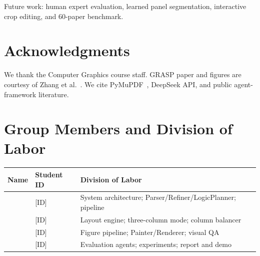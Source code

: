 \documentclass{article}
\begin{document}
Future work: human expert evaluation, learned panel segmentation, interactive crop editing, and 60-paper benchmark.

\section*{Acknowledgments}
We thank the Computer Graphics course staff. GRASP paper and figures are courtesy of Zhang et al.~\citep{zhang2025grasp}. We cite PyMuPDF~\citep{pymupdf}, DeepSeek API, and public agent-framework literature.

\section*{Group Members and Division of Labor}
\begin{table}[h]
  \centering
  \small
  \begin{tabular}{llp{7.5cm}}
    \toprule
    Name & Student ID & Division of Labor \\
    \midrule
    [Member 1] & [ID] & System architecture; Parser/Refiner/LogicPlanner; pipeline \\
    [Member 2] & [ID] & Layout engine; three-column mode; column balancer \\
    [Member 3] & [ID] & Figure pipeline; Painter/Renderer; visual QA \\
    [Member 4] & [ID] & Evaluation agents; experiments; report and demo \\
    \bottomrule
  \end{tabular}
\end{table}



\end{document}
